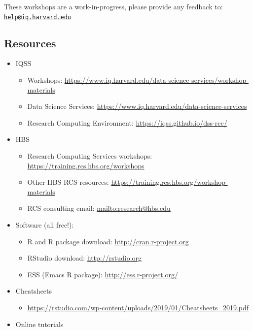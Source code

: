 \documentclass[
]{book}
\providecommand{\tightlist}{%
  \setlength{\itemsep}{0pt}\setlength{\parskip}{0pt}}
\begin{document}
These workshops are a work-in-progress, please provide any feedback to: \href{mailto:help@iq.harvard.edu}{\nolinkurl{help@iq.harvard.edu}}

\hypertarget{resources-2}{%
\subsection{Resources}\label{resources-2}}

\begin{itemize}
\tightlist
\item
  IQSS

  \begin{itemize}
  \tightlist
  \item
    Workshops: \url{https://www.iq.harvard.edu/data-science-services/workshop-materials}
  \item
    Data Science Services: \url{https://www.iq.harvard.edu/data-science-services}
  \item
    Research Computing Environment: \url{https://iqss.github.io/dss-rce/}
  \end{itemize}
\item
  HBS

  \begin{itemize}
  \tightlist
  \item
    Research Computing Services workshops: \url{https://training.rcs.hbs.org/workshops}
  \item
    Other HBS RCS resources: \url{https://training.rcs.hbs.org/workshop-materials}
  \item
    RCS consulting email: \url{mailto:research@hbs.edu}
  \end{itemize}
\item
  Software (all free!):

  \begin{itemize}
  \tightlist
  \item
    R and R package download: \url{http://cran.r-project.org}
  \item
    RStudio download: \url{http://rstudio.org}
  \item
    ESS (Emacs R package): \url{http://ess.r-project.org/}
  \end{itemize}
\item
  Cheatsheets

  \begin{itemize}
  \tightlist
  \item
    \url{https://rstudio.com/wp-content/uploads/2019/01/Cheatsheets_2019.pdf}
  \end{itemize}
\item
  Online tutorials


\end{itemize}
\end{document}
